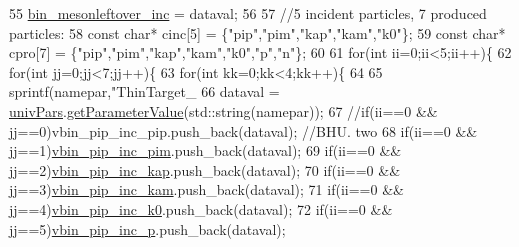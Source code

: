 \begin{DoxyCode}
{55     \hyperlink{class_neutrino_flux_reweight_1_1_thin_target_meson_incident_reweighter_af8a00936922518cafeca2199c385c3f8}{bin\_mesonleftover\_inc} = dataval;
56     
57     \textcolor{comment}{//5 incident particles, 7 produced particles:}
58     \textcolor{keyword}{const} \textcolor{keywordtype}{char}* cinc[5] = \{\textcolor{stringliteral}{"pip"},\textcolor{stringliteral}{"pim"},\textcolor{stringliteral}{"kap"},\textcolor{stringliteral}{"kam"},\textcolor{stringliteral}{"k0"}\};
59     \textcolor{keyword}{const} \textcolor{keywordtype}{char}* cpro[7] = \{\textcolor{stringliteral}{"pip"},\textcolor{stringliteral}{"pim"},\textcolor{stringliteral}{"kap"},\textcolor{stringliteral}{"kam"},\textcolor{stringliteral}{"k0"},\textcolor{stringliteral}{"p"},\textcolor{stringliteral}{"n"}\};
60     
61     \textcolor{keywordflow}{for}(\textcolor{keywordtype}{int} ii=0;ii<5;ii++)\{
62       \textcolor{keywordflow}{for}(\textcolor{keywordtype}{int} jj=0;jj<7;jj++)\{
63         \textcolor{keywordflow}{for}(\textcolor{keywordtype}{int} kk=0;kk<4;kk++)\{
64           
65           sprintf(namepar,\textcolor{stringliteral}{"ThinTarget\_%
66           dataval = \hyperlink{class_neutrino_flux_reweight_1_1_thin_target_meson_incident_reweighter_a04e7825e0d90c6a0315028620f2ac511}{univPars}.\hyperlink{class_neutrino_flux_reweight_1_1_parameter_table_acb7dc8335b65b116f6092f2fa57ca5ed}{getParameterValue}(std::string(namepar));
67          \textcolor{comment}{//if(ii==0 && jj==0)vbin\_pip\_inc\_pip.push\_back(dataval);   //BHU. two}
68           \textcolor{keywordflow}{if}(ii==0 && jj==1)\hyperlink{class_neutrino_flux_reweight_1_1_thin_target_meson_incident_reweighter_aaf511004916c8cde16914f776bd24567}{vbin\_pip\_inc\_pim}.push\_back(dataval);
69           \textcolor{keywordflow}{if}(ii==0 && jj==2)\hyperlink{class_neutrino_flux_reweight_1_1_thin_target_meson_incident_reweighter_a313579b46a30eab2e8181bdbb616400b}{vbin\_pip\_inc\_kap}.push\_back(dataval);
70           \textcolor{keywordflow}{if}(ii==0 && jj==3)\hyperlink{class_neutrino_flux_reweight_1_1_thin_target_meson_incident_reweighter_a4b9a6dea5fa9006465b9869f7f5a7ef4}{vbin\_pip\_inc\_kam}.push\_back(dataval);
71           \textcolor{keywordflow}{if}(ii==0 && jj==4)\hyperlink{class_neutrino_flux_reweight_1_1_thin_target_meson_incident_reweighter_a4dc56ba2cd4aefe825f48334dc9fd570}{vbin\_pip\_inc\_k0}.push\_back(dataval);
72           \textcolor{keywordflow}{if}(ii==0 && jj==5)\hyperlink{class_neutrino_flux_reweight_1_1_thin_target_meson_incident_reweighter_a094b50773eedca4a30e58067d55b61c7}{vbin\_pip\_inc\_p}.push\_back(dataval);
}}
\end{DoxyCode}
